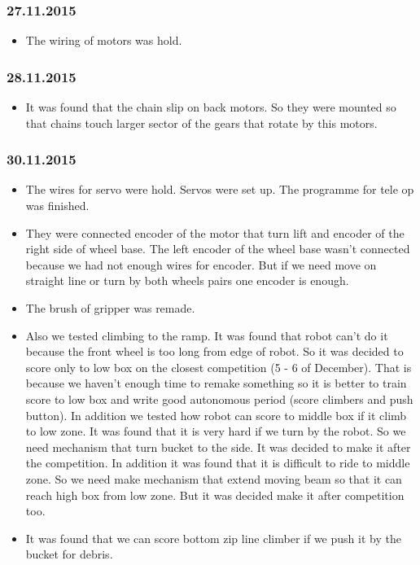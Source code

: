 \subsubsection{27.11.2015}
\begin{itemize}
\item The wiring of motors was hold.
\end{itemize}
\subsubsection{28.11.2015}
\begin{itemize}
\item It was found that the chain slip on back motors. So they were mounted so that chains touch larger sector of the gears that rotate by this motors.
\end{itemize}
\subsubsection{30.11.2015}
\begin{itemize}
\item The wires for servo were hold. Servos were set up. The programme for tele op was finished.
\item They were connected encoder of the motor that turn lift and encoder of the right side of wheel base. The left encoder of the wheel base wasn't connected because we had not enough wires for encoder. But if we need move on straight line or turn by both wheels pairs one encoder is enough.
\item The brush of gripper was remade.
\item Also we tested climbing to the ramp. It was found that robot can't do it because the front wheel is too long from edge of robot. So it was decided to score only to low box on the closest competition (5 - 6 of December). That is because we haven't enough time to remake something so it is better to train score to low box and write good autonomous period (score climbers and push button). In addition we tested how robot can score to middle box if it climb to low zone. It was found that it is very hard if we turn by the robot. So we need mechanism that turn bucket to the side. It was decided to make it after the competition. In addition it was found that it is difficult to ride to middle zone. So we need make mechanism that extend moving beam so that it can reach high box from low zone. But it was decided make it after competition too.
\item It was found that we can score bottom zip line climber if we push it by the bucket for debris. 
\end{itemize}
